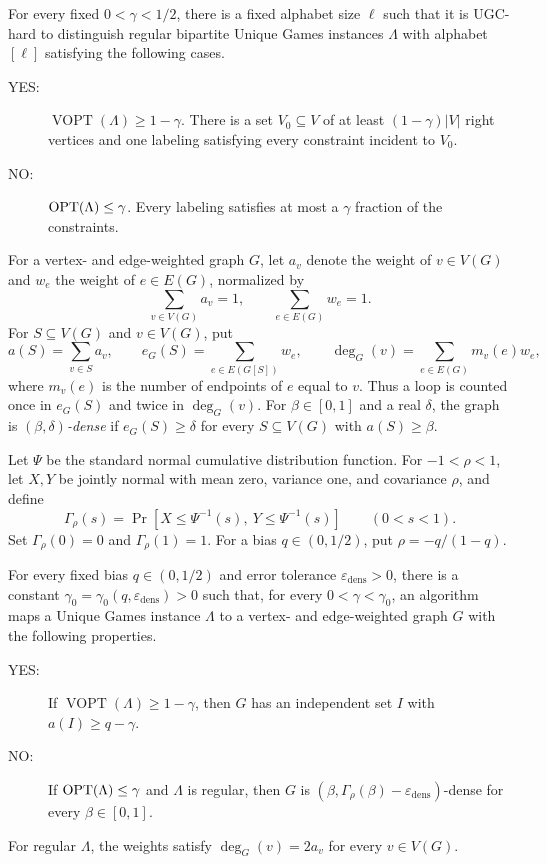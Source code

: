 \begin{theorem}
\label{thm:regular-ug-source}
For every fixed $0<\gamma<1/2$, there is a fixed alphabet size $\ell$
such that it is UGC-hard to distinguish regular bipartite Unique
Games instances $\Lambda$ with alphabet $[\ell]$ satisfying the
following cases.
\begin{description}
\item[YES:] $\operatorname{VOPT}(\Lambda)\geq1-\gamma$.
 There is a set $V_0\subseteq V$ of at least $(1-\gamma)|V|$ right
 vertices and one labeling satisfying every constraint incident
 to $V_0$.
\item[NO:] $\operatorname{OPT}(\Lambda)\leq\gamma$.
 Every labeling satisfies at most a $\gamma$ fraction of the
 constraints.
\end{description}
\end{theorem}

For a vertex- and edge-weighted graph $G$, let $a_v$ denote the weight
of $v\in V(G)$ and $w_e$ the weight of $e\in E(G)$, normalized by
\[
 \sum_{v\in V(G)}a_v=1,\qquad \sum_{e\in E(G)}w_e=1.
\]
For $S\subseteq V(G)$ and $v\in V(G)$, put
\[
 a(S)=\sum_{v\in S}a_v,\qquad
 e_G(S)=\sum_{e\in E(G[S])}w_e,\qquad
 \deg_G(v)=\sum_{e\in E(G)}m_v(e)w_e,
\]
where $m_v(e)$ is the number of endpoints of $e$ equal to $v$.
Thus a loop is counted once in $e_G(S)$ and twice in $\deg_G(v)$.
For $\beta\in[0,1]$ and a real $\delta$, the graph is
\emph{$(\beta,\delta)$-dense} if $e_G(S)\geq\delta$ for every
$S\subseteq V(G)$ with $a(S)\geq\beta$.

Let $\Psi$ be the standard normal cumulative distribution function.
For $-1<\rho<1$, let $X,Y$ be jointly normal with mean zero,
variance one, and covariance $\rho$, and define
\[
 \Gamma_\rho(s)=
 \Pr[X\leq\Psi^{-1}(s),\ Y\leq\Psi^{-1}(s)]
 \qquad(0<s<1).
\]
Set $\Gamma_\rho(0)=0$ and $\Gamma_\rho(1)=1$.
For a bias $q\in(0,1/2)$, put $\rho=-q/(1-q)$.

\begin{theorem}
\label{thm:aks-density-source}
For every fixed bias $q\in(0,1/2)$ and error tolerance
$\varepsilon_{\mathrm{dens}}>0$, there is a constant
$\gamma_0=\gamma_0(q,\varepsilon_{\mathrm{dens}})>0$ such that,
for every $0<\gamma<\gamma_0$, an algorithm maps a Unique Games
instance $\Lambda$ to a vertex- and edge-weighted graph $G$ with
the following properties.
\begin{description}
\item[YES:] If $\operatorname{VOPT}(\Lambda)\geq1-\gamma$, then
 $G$ has an independent set $I$ with $a(I)\geq q-\gamma$.
\item[NO:] If $\operatorname{OPT}(\Lambda)\leq\gamma$ and
 $\Lambda$ is regular, then $G$ is
 $(\beta,\Gamma_\rho(\beta)-\varepsilon_{\mathrm{dens}})$-dense
 for every $\beta\in[0,1]$.
\end{description}
For regular $\Lambda$, the weights satisfy
$\deg_G(v)=2a_v$ for every $v\in V(G)$.
\end{theorem}

